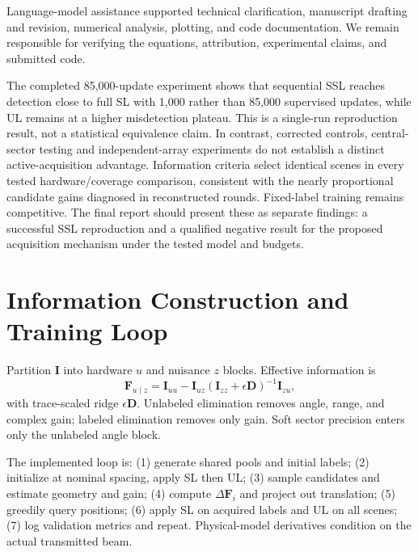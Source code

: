 \documentclass[conference]{IEEEtran}
\newcommand{\F}{\mathbf{F}}
\begin{document}
Language-model assistance supported technical clarification, manuscript drafting and revision, numerical analysis, plotting, and code documentation. We remain responsible for verifying the equations, attribution, experimental claims, and submitted code.

The completed 85,000-update experiment shows that sequential SSL reaches detection close to full SL with 1,000 rather than 85,000 supervised updates, while UL remains at a higher misdetection plateau. This is a single-run reproduction result, not a statistical equivalence claim. In contrast, corrected controls, central-sector testing and independent-array experiments do not establish a distinct active-acquisition advantage. Information criteria select identical scenes in every tested hardware/coverage comparison, consistent with the nearly proportional candidate gains diagnosed in reconstructed rounds. Fixed-label training remains competitive. The final report should present these as separate findings: a successful SSL reproduction and a qualified negative result for the proposed acquisition mechanism under the tested model and budgets.

\appendices
\section{Information Construction and Training Loop}
Partition $\mathbf I$ into hardware $u$ and nuisance $z$ blocks. Effective information is
\begin{equation}
 \F_{u\mid z}=\mathbf I_{uu}-\mathbf I_{uz}
 (\mathbf I_{zz}+\epsilon\mathbf D)^{-1}\mathbf I_{zu},
\end{equation}
with trace-scaled ridge $\epsilon\mathbf D$. Unlabeled elimination removes angle, range, and complex gain; labeled elimination removes only gain. Soft sector precision enters only the unlabeled angle block.

The implemented loop is: (1) generate shared pools and initial labels; (2) initialize at nominal spacing, apply SL then UL; (3) sample candidates and estimate geometry and gain; (4) compute $\Delta\F_i$ and project out translation; (5) greedily query positions; (6) apply SL on acquired labels and UL on all scenes; (7) log validation metrics and repeat. Physical-model derivatives condition on the actual transmitted beam.
\end{document}
